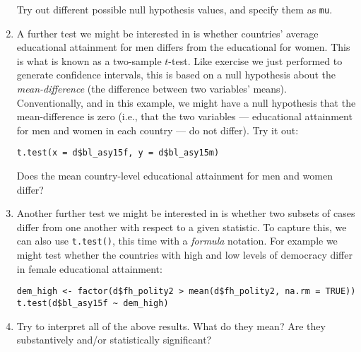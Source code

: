 \documentclass[a4paper,12pt]{article}
\begin{document}
\begin{enumerate}
\noindent Try out different possible null hypothesis values, and specify them as \texttt{mu}.

\item A further test we might be interested in is whether countries' average educational attainment for men differs from the educational for women. This is what is known as a two-sample $t$-test. Like exercise we just performed to generate confidence intervals, this is based on a null hypothesis about the \textit{mean-difference} (the difference between two variables' means). Conventionally, and in this example, we might have a null hypothesis that the mean-difference is zero (i.e., that the two variables --- educational attainment for men and women in each country --- do not differ). Try it out:

\begin{verbatim}
t.test(x = d$bl_asy15f, y = d$bl_asy15m)
\end{verbatim}

\noindent Does the mean country-level educational attainment for men and women differ?

\item Another further test we might be interested in is whether two subsets of cases differ from one another with respect to a given statistic. To capture this, we can also use \texttt{t.test()}, this time with a \textit{formula} notation. For example we might test whether the countries with high and low levels of democracy differ in female educational attainment:

\begin{verbatim}
dem_high <- factor(d$fh_polity2 > mean(d$fh_polity2, na.rm = TRUE))
t.test(d$bl_asy15f ~ dem_high)
\end{verbatim}

\item Try to interpret all of the above results. What do they mean? Are they substantively and/or statistically significant?

\vspace{4em}


\end{enumerate}
\end{document}
